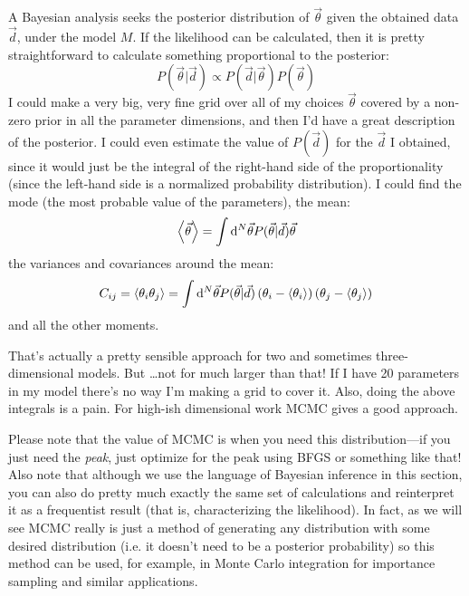 A Bayesian analysis seeks the posterior distribution of $\vec{\theta}$
given the obtained data $\vec{d}$, under the model $M$. If the
likelihood can be calculated, then it is pretty straightforward to
calculate something proportional to the posterior:
\begin{equation}
P(\vec{\theta} | \vec{d} ) \propto P(\vec{d} | \vec{\theta} )
P(\vec{\theta})
\end{equation}
I could make a very big, very fine grid over all of my choices
$\vec{\theta}$ covered by a non-zero prior in all the parameter
dimensions, and then I'd have a great description of the posterior. I
could even estimate the value of $P(\vec{d})$ for the $\vec{d}$ I
obtained, since it would just be the integral of the right-hand side
of the proportionality (since the left-hand side is a normalized
probability distribution). I could find the mode (the most probable
value of the parameters), the mean:
\begin{equation}
\left\langle \vec{\theta} \right\rangle = \int {\rm d}^N\vec{\theta}
P(\vec{\theta}|\vec{d}) \vec{\theta}
\end{equation}
the variances and covariances around the mean:
\begin{equation}
C_{ij} = \left\langle {\theta_i} {\theta_j} \right\rangle = \int {\rm d}^N\vec{\theta}
P(\vec{\theta}|\vec{d})
\left(\theta_i - \langle\theta_i\rangle\right)
\left(\theta_j - \langle\theta_j\rangle\right)
\end{equation}
and all the other moments.

That's actually a pretty sensible approach for two and sometimes
three-dimensional models. But \ldots not for much larger than that! If
I have 20 parameters in my model there's no way I'm making a grid to
cover it. Also, doing the above integrals is a pain. For high-ish
dimensional work MCMC gives a good approach.

Please note that the value of MCMC is when you need this
distribution---if you just need the {\it peak}, just optimize for the
peak using BFGS or something like that! Also note that although we use
the language of Bayesian inference in this section, you can also do
pretty much exactly the same set of calculations and reinterpret it as
a frequentist result (that is, characterizing the likelihood). In
fact, as we will see MCMC really is just a method of generating any
distribution with some desired distribution (i.e. it doesn't need to
be a posterior probability) so this method can be used, for example,
in Monte Carlo integration for importance sampling and similar
applications.

